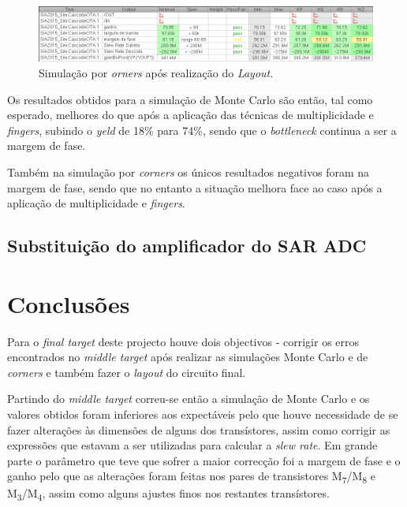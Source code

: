 \documentclass[11pt]{article}
\numberwithin{equation}{section}
\begin{document}
\begin{figure}[H]
	\centering
	\includegraphics[keepaspectratio=true, scale=0.50]{exps/Corners_Novo_Layout}
	\vspace{-0.5em}
	\caption{Simulação por \textit{orners} após realização do \textit{Layout}.}
	\vspace{-0.8em} 
\end{figure}

Os resultados obtidos para a simulação de Monte Carlo são então, tal como esperado, melhores do que após a aplicação das técnicas de multiplicidade e \textit{fingers}, subindo o \textit{yeld} de 18\% para 74\%, sendo que o \textit{bottleneck} continua a ser a margem de fase.

Também na simulação por \textit{corners} os únicos resultados negativos foram na margem de fase, sendo que no entanto a situação melhora face ao caso após  a aplicação de multiplicidade e \textit{fingers}.



\subsection{Substituição do amplificador do SAR ADC}


\pagebreak

\section{Conclusões}

Para o \textit{final target} deste projecto houve dois objectivos - corrigir os erros encontrados no \textit{middle target} após realizar as simulações Monte Carlo e de \textit{corners} e também fazer o \textit{layout} do circuito final.

Partindo do \textit{middle target} correu-se então a simulação de Monte Carlo e os valores obtidos foram inferiores aos expectáveis pelo que houve necessidade de se fazer alterações às dimensões de alguns dos transístores, assim como corrigir as expressões que estavam a ser utilizadas para calcular a \textit{slew rate}. Em grande parte o parâmetro que teve que sofrer a maior correcção foi a margem de fase e o ganho pelo que as alterações foram feitas nos pares de transistores M\textsubscript{7}/M\textsubscript{8} e M\textsubscript{3}/M\textsubscript{4}, assim como alguns ajustes finos nos restantes transístores.
\end{document}
